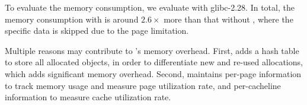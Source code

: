 To evaluate the memory consumption, we  evaluate \MP{} with glibc-2.28. In total, the memory consumption with \MP{} is around $2.6\times$ more than that without \MP{}, where the specific data is skipped due to the page limitation. 

 Multiple reasons may contribute to \MP{}'s memory overhead. First, \MP{} adds a hash table to store all allocated objects, in order to differentiate new and re-used allocations, which adds significant memory overhead. Second, \MP{} maintains per-page information to track memory usage and measure page utilization rate, and per-cacheline information to measure cache utilization rate. 

 





